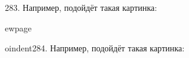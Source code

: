 283. Например, подойдёт такая картинка:
\begin{center}
\begin{figure}[ht!]
\end{figure}
\end{center}
ewpage

oindent284. Например, подойдёт такая картинка:
\begin{center}
\begin{figure}[ht!]
\end{figure}
\end{center}
